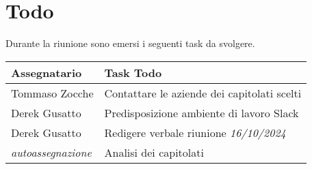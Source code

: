 \section{Todo}
Durante la riunione sono emersi i seguenti task da svolgere.

\begin{center}
  \begin{tabular}{|p{5cm}|p{8cm}|}
    \hline
    \textbf{Assegnatario}       & \textbf{Task Todo}                             \\ \hline
    Tommaso Zocche & Contattare le aziende dei capitolati scelti       \\ \hline
    Derek Gusatto   & Predisposizione ambiente di lavoro Slack \\ \hline
    Derek Gusatto   & Redigere verbale riunione \textit{16/10/2024}  \\ \hline
    \textit{autoassegnazione}   & Analisi dei capitolati   \\ \hline
  \end{tabular}
\end{center}
